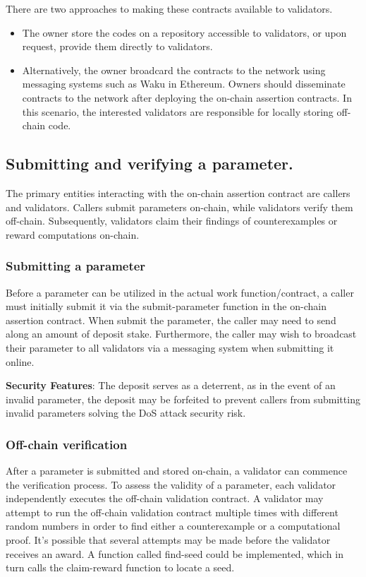 \documentclass[runningheads]{llncs}
\begin{document}
There are two approaches to making these contracts available to validators.
\begin{itemize}
\item The owner store the codes on a repository accessible to validators, or upon request, provide them directly to validators.
\item Alternatively, the owner broadcard the contracts to the network using messaging systems such as Waku in Ethereum. Owners should disseminate contracts to the network after deploying the on-chain assertion contracts. In this scenario, the interested validators are responsible for locally storing off-chain code.
\end{itemize}

\subsection{Submitting and verifying a parameter.} The primary entities interacting with the on-chain assertion contract are callers and validators. Callers submit parameters on-chain, while validators verify them off-chain. Subsequently, validators claim their findings of counterexamples or reward computations on-chain. 
\subsubsection{Submitting a parameter} 
Before a parameter can be utilized in the actual work function/contract, a caller must initially submit it via the submit-parameter function in the on-chain assertion contract. When submit the parameter, the caller may need to send along an amount of deposit stake. Furthermore, the caller may wish to broadcast their parameter to all validators via a messaging system when submitting it online.

\textbf{Security Features}: 
The deposit serves as a deterrent, as in the event of an invalid parameter, the deposit may be forfeited to prevent callers from submitting invalid parameters solving the DoS attack security risk. 
\subsubsection{Off-chain verification}

After a parameter is submitted and stored on-chain, a validator can commence the verification process. To assess the validity of a parameter, each validator independently executes the off-chain validation contract. A validator may attempt to run the off-chain validation contract multiple times with different random numbers in order to find either a counterexample or a computational proof. It's possible that several attempts may be made before the validator receives an award.  A function called find-seed could be implemented, which in turn calls the claim-reward function to locate a seed.
\end{document}
